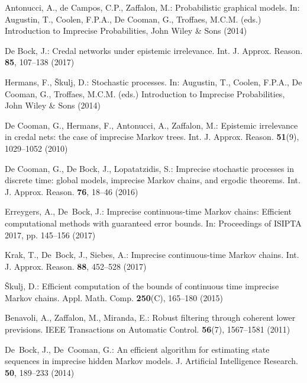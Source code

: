 \begin{thebibliography}{99.}
Antonucci, A., de Campos, C.P., Zaffalon, M.: {Probabilistic graphical models}. In: Augustin, T., Coolen, F.P.A., De Cooman, G., Troffaes, M.C.M. (eds.) Introduction to Imprecise Probabilities, {John Wiley \& Sons} (2014) 

De Bock, J.: {Credal networks under epistemic irrelevance}. Int. J. Approx. Reason. \textbf{85}, 107--138 (2017)


Hermans, F., {\v{S}}kulj, D.: {Stochastic processes}.
In: Augustin, T., Coolen, F.P.A., De Cooman, G., Troffaes, M.C.M. (eds.) Introduction to Imprecise Probabilities, {John Wiley \& Sons} (2014) 

De Cooman, G., Hermans, F., Antonucci, A., Zaffalon, M.: {Epistemic irrelevance in credal nets: the case of imprecise Markov trees}. Int. J. Approx. Reason. \textbf{51}(9), 1029--1052 (2010)

De Cooman, G., De Bock, J., Lopatatzidis, S.: {Imprecise stochastic processes in discrete time: global models, imprecise Markov chains, and ergodic theorems}. Int. J. Approx. Reason. \textbf{76}, 18--46 (2016)


Erreygers, A., De~Bock, J.: {Imprecise continuous-time Markov chains: Efficient
  computational methods with guaranteed error bounds}. In: Proceedings of ISIPTA
  2017, pp. 145--156 (2017)

Krak, T., De~Bock, J., Siebes, A.: {Imprecise continuous-time {M}arkov chains}.
  Int. J. Approx. Reason. \textbf{88}, 452--528 (2017)

{\v{S}}kulj, D.: {Efficient computation of the bounds of continuous time
  imprecise Markov chains}. Appl. Math. Comp. \textbf{250}(C), 165--180 (2015)


Benavoli, A., Zaffalon, M., Miranda, E.: {Robust filtering through coherent lower previsions}. IEEE Transactions on Automatic Control. \textbf{56}(7), 1567--1581 (2011)

De~Bock, J., De~Cooman, G.: {An efficient algorithm for estimating state sequences in imprecise hidden Markov models}. J. Artificial Intelligence Research. \textbf{50}, 189--233 (2014)


\end{thebibliography}
